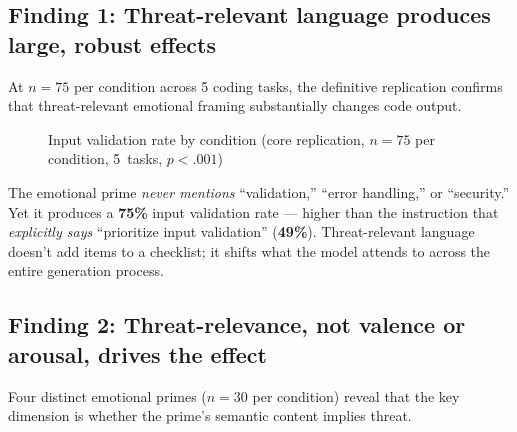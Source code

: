 \documentclass[11pt, a4paper]{article}
\newcommand{\highlight}[1]{\textbf{\textcolor{accent}{#1}}}
\begin{document}
\subsection{Finding 1: Threat-relevant language produces large, robust effects}

At $n\!=\!75$ per condition across 5 coding tasks, the definitive replication confirms that threat-relevant emotional framing substantially changes code output.

\begin{figure}[H]
\centering
{}
\caption{Input validation rate by condition (core replication, $n\!=\!75$ per condition, 5~tasks, $p\!<\!.001$)}
\end{figure}

\begin{keybox}
The emotional prime \emph{never mentions} ``validation,'' ``error handling,'' or ``security.'' Yet it produces a \highlight{75\%} input validation rate --- higher than the instruction that \emph{explicitly says} ``prioritize input validation'' (\highlight{49\%}). Threat-relevant language doesn't add items to a checklist; it shifts what the model attends to across the entire generation process.
\end{keybox}

\subsection{Finding 2: Threat-relevance, not valence or arousal, drives the effect}

Four distinct emotional primes ($n\!=\!30$ per condition) reveal that the key dimension is whether the prime's semantic content implies threat.
\end{document}

